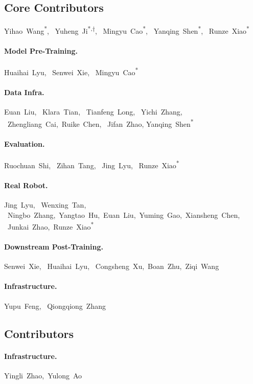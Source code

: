 \documentclass{llmxive}
\begin{document}
\subsection{Core Contributors} 
Yihao~Wang\textsuperscript{*}, \
Yuheng~Ji\textsuperscript{*,$\dagger$}, \ 
Mingyu~Cao\textsuperscript{*}, \
Yanqing~Shen\textsuperscript{*}, \
Runze~Xiao\textsuperscript{*}


\paragraph{Model Pre-Training.} 
Huaihai~Lyu, \
Senwei~Xie, \
Mingyu~Cao\textsuperscript{*}


\paragraph{Data Infra.}
Euan~Liu, \
Klara~Tian, \
Tianfeng~Long, \
Yichi~Zhang, \
Zhengliang~Cai,\
Ruike~Chen,  \
Jifan~Zhao, Yanqing~Shen\textsuperscript{*} 


\paragraph{Evaluation.} 
Ruochuan~Shi, \
Zihan~Tang, \
Jing~Lyu, \
Runze~Xiao\textsuperscript{*}

\paragraph{Real Robot.}
Jing~Lyu, \
Wenxing~Tan, \
Ningbo~Zhang,\ 
Yangtao~Hu,\
Euan~Liu,\
Yuming~Gao,\
Xiansheng~Chen, \
Junkai~Zhao,\
Runze~Xiao\textsuperscript{*}

\paragraph{Downstream Post-Training.}
Senwei~Xie, \
Huaihai~Lyu, \
Congsheng~Xu,\
Boan~Zhu,\
Ziqi~Wang

\paragraph{Infrastructure.} 
Yupu~Feng, \
Qiongqiong~Zhang


\subsection{Contributors} 

\paragraph{Infrastructure.}
Yingli~Zhao,\
Yulong~Ao
\end{document}
